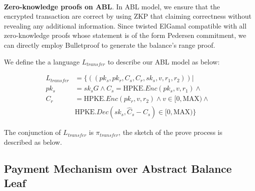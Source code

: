 \documentclass{article}
\begin{document}
~\\
\noindent\textbf{Zero-knowledge proofs on ABL}. In ABL model, we ensure that the encrypted transaction are correct by using ZKP that claiming correctness without revealing any additional information. Since twisted ElGamal compatible with all zero-knowledge proofs whose statement is of the form Pedersen commitment, we can directly employ Bulletproof to generate the balance's range proof. 

We define the a language $L_{transfer}$ to describe our ABL model as below:

\begin{equation}
\begin{aligned}
    L_{transfer} &= \{((pk_s, pk_r, C_s, C_r, sk_s, v, r_1, r_2)) | \\ 
        pk_s &= sk_sG \land C_s = \mbox{HPKE}.Enc(pk_s,v, r_1) \land \\
        C_r &=  \mbox{HPKE}.Enc(pk_r,v, r_2) \land v \in [0, \mbox{MAX}) \land \\
        &\mbox{HPKE}.Dec(sk_s, \hat{C}_s - C_s) \in [0, \mbox{MAX})\}
\end{aligned}
\end{equation}

The conjunction of $L_{transfer}$ is $\pi_{transfer}$, the sketch of the prove process is described as below.


\subsection{Payment Mechanism over Abstract Balance Leaf} \label{section:pay-abl}
\end{document}
